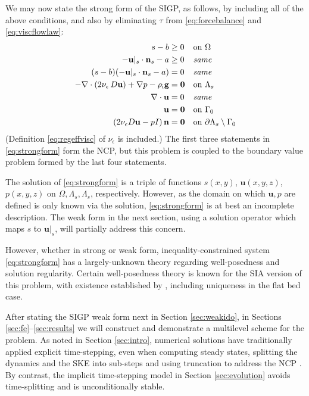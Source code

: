 \documentclass[letterpaper,final,12pt,reqno]{amsart}
\theoremstyle{claim}
\newcommand{\eps}{\epsilon}
\newcommand{\bn}{\mathbf{n}}
\newcommand{\bu}{\mathbf{u}}
\newcommand{\bzero}{\bm{0}}
\newcommand{\rhoi}{\rho_{\text{i}}}
\numberwithin{equation}{section}
\numberwithin{figure}{section}
\numberwithin{table}{section}
\numberwithin{theorem}{section}
\begin{document}
We may now state the strong form of the SIGP, as follows, by including all of the above conditions, and also by eliminating $\tau$ from \eqref{eq:forcebalance} and \eqref{eq:viscflowlaw}:
\begin{align}
s - b &\ge 0 && \text{on $\Omega$} \label{eq:strongform} \\
- \bu|_s \cdot \bn_s - a &\ge 0 && \text{\emph{same}} \notag \\
(s - b) (- \bu|_s \cdot \bn_s - a) &= 0 && \text{\emph{same}} \notag \\
- \nabla \cdot \left(2 \nu_\eps\, D\bu\right) + \nabla p - \rhoi \mathbf{g} &= \bzero && \text{on $\Lambda_s$} \notag \\
\nabla \cdot \bu &= 0 && \text{\emph{same}} \notag \\
\bu &= \bzero && \text{on $\Gamma_0$} \notag \\
\left(2 \nu_\eps D\bu - pI\right) \bn &= \bzero && \text{on $\partial \Lambda_s \setminus \Gamma_0$} \notag
\end{align}
(Definition \eqref{eq:regeffvisc} of $\nu_\eps$ is included.)  The first three statements in \eqref{eq:strongform} form the NCP, but this problem is coupled to the boundary value problem formed by the last four statements.

The solution of \eqref{eq:strongform} is a triple of functions $s(x,y)$, $\bu(x,y,z)$, $p(x,y,z)$ on $\Omega,\Lambda_s,\Lambda_s$, respectively.  However, as the domain on which $\bu,p$ are defined is only known via the solution, \eqref{eq:strongform} is at best an incomplete description.  The weak form in the next section, using a solution operator which maps $s$ to $\bu|_s$, will partially address this concern.

However, whether in strong or weak form, inequality-constrained system \eqref{eq:strongform} has a largely-unknown theory regarding well-posedness and solution regularity.  Certain well-posedness theory is known for the SIA version of this problem, with existence established by \cite{JouvetBueler2012}, including uniqueness in the flat bed case.

After stating the SIGP weak form next in Section \ref{sec:weakido}, in Sections \ref{sec:fe}--\ref{sec:results} we will construct and demonstrate a multilevel scheme for the problem.  As noted in Section \ref{sec:intro}, numerical solutions have traditionally applied explicit time-stepping, even when computing steady states, splitting the dynamics and the SKE into sub-steps and using truncation to address the NCP \cite[for example]{Jouvetetal2008,Lengetal2012}.  By contrast, the implicit time-stepping model in Section \ref{sec:evolution} avoids time-splitting and is unconditionally stable.
\end{document}
